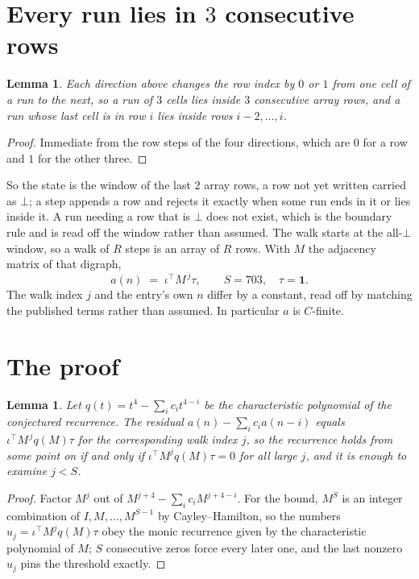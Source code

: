\documentclass[11pt,a4paper]{article}
\theoremstyle{plain}
\newtheorem{lemma}[theorem]{Lemma}
\theoremstyle{definition}
\begin{document}
\section{Every run lies in $3$ consecutive rows}

\begin{lemma}\label{lem:win}
Each direction above changes the row index by $0$ or $1$ from one cell of a run to the next, so
a run of $3$ cells lies inside $3$ consecutive array rows, and a run whose last cell is in
row $i$ lies inside rows $i-2,\dots,i$.
\end{lemma}

\begin{proof}
Immediate from the row steps of the four directions, which are $0$ for a row and $1$ for the
other three.
\end{proof}

So the state is the window of the last $2$ array rows, a row not yet written carried as
$\bot$; a step appends a row and rejects it exactly when some run ends in it or lies inside it.
A run needing a row that is $\bot$ does not exist, which is the boundary rule and is read off
the window rather than assumed. The walk starts at the all-$\bot$ window, so a walk of $R$ steps
is an array of $R$ rows. With $M$ the adjacency matrix of that digraph,
\[
a(n)\;=\;\iota^{\!\top}M^{\,j}\tau ,\qquad S=703,\quad\tau=\mathbf{1} .
\]
The walk index $j$ and the entry's own $n$ differ by a constant, read off by matching the
published terms rather than assumed. In particular $a$ is $C$-finite.

\section{The proof}

\begin{lemma}\label{lem:crit}
Let $q(t)=t^{4}-\sum_i c_it^{4-i}$ be the characteristic polynomial of the
conjectured recurrence. The residual $a(n)-\sum_ic_ia(n-i)$ equals
$\iota^{\!\top}M^{\,j}q(M)\tau$ for the corresponding walk index $j$, so the recurrence
holds from some point on if and only if $\iota^{\!\top}M^{j}q(M)\tau=0$ for all large $j$,
and it is enough to examine $j<S$.
\end{lemma}

\begin{proof}
Factor $M^{j}$ out of $M^{j+4}-\sum_ic_iM^{j+4-i}$. For the bound, $M^{S}$
is an integer combination of $I,M,\dots,M^{S-1}$ by Cayley--Hamilton, so the numbers
$u_j=\iota^{\!\top}M^{j}q(M)\tau$ obey the monic recurrence given by the characteristic
polynomial of $M$; $S$ consecutive zeros force every later one, and the last nonzero $u_j$
pins the threshold exactly.
\end{proof}
\end{document}
